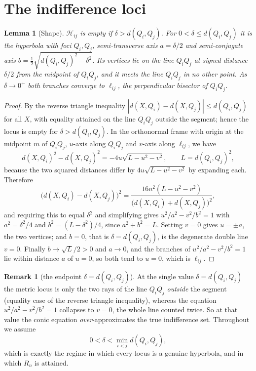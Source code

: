 ﻿\documentclass[11pt,a4paper]{article}
\newtheorem{lemma}[theorem]{Lemma}
\theoremstyle{definition}
\newtheorem{remark}[theorem]{Remark}
\theoremstyle{remark}
\newcommand{\HH}{\mathcal{H}}
\begin{document}
\section{The indifference loci}
\label{sec:geometry}

\begin{lemma}[Shape]\label{lem:hyperbola}
$\HH_{ij}$ is empty if $\delta>d(Q_i,Q_j)$.  For $0<\delta\le d(Q_i,Q_j)$ it is
the hyperbola with foci $Q_i,Q_j$, semi-transverse axis $a=\delta/2$ and
semi-conjugate axis $b=\tfrac12\sqrt{d(Q_i,Q_j)^2-\delta^2}$.  Its vertices lie
on the line $Q_iQ_j$ at signed distance $\delta/2$ from the midpoint of
$Q_iQ_j$, and it meets the line $Q_iQ_j$ in no other point.  As $\delta\to0^+$
both branches converge to $\ell_{ij}$, the perpendicular bisector of $Q_iQ_j$.
\end{lemma}

\begin{proof}
By the reverse triangle inequality $|d(X,Q_i)-d(X,Q_j)|\le d(Q_i,Q_j)$ for all
$X$, with equality attained on the line $Q_iQ_j$ outside the segment; hence the
locus is empty for $\delta>d(Q_i,Q_j)$.  In the orthonormal frame with origin at
the midpoint $m$ of $Q_iQ_j$, $u$-axis along $Q_iQ_j$ and $v$-axis along
$\ell_{ij}$, we have
\[
d(X,Q_i)^2-d(X,Q_j)^2=-4u\sqrt{L-u^2-v^2},\qquad L=d(Q_i,Q_j)^2,
\]
because the two squared distances differ by $4u\sqrt{L-u^2-v^2}$ by expanding
each.  Therefore
\[
\bigl(d(X,Q_i)-d(X,Q_j)\bigr)^2
=\frac{16u^2(L-u^2-v^2)}{\bigl(d(X,Q_i)+d(X,Q_j)\bigr)^2},
\]
and requiring this to equal $\delta^2$ and simplifying gives
$u^2/a^2-v^2/b^2=1$ with $a^2=\delta^2/4$ and $b^2=(L-\delta^2)/4$, since
$a^2+b^2=L$.  Setting $v=0$ gives $u=\pm a$, the two vertices; and $b=0$, that
is $\delta=d(Q_i,Q_j)$, is the degenerate double line $v=0$.  Finally
$b\to\sqrt L/2>0$ and $a\to0$, and the branches of $u^2/a^2-v^2/b^2=1$ lie
within distance $a$ of $u=0$, so both tend to $u=0$, which is $\ell_{ij}$.
\end{proof}

\begin{remark}[the endpoint $\delta=d(Q_i,Q_j)$]\label{rem:endpoint}
At the single value $\delta=d(Q_i,Q_j)$ the metric locus is only the two rays
of the line $Q_iQ_j$ \emph{outside} the segment (equality case of the reverse
triangle inequality), whereas the equation $u^2/a^2-v^2/b^2=1$ collapses to
$v=0$, the whole line counted twice.  So at that value the conic equation
\emph{over}-approximates the true indifference set.  Throughout we assume
\begin{equation}\label{eq:hyperbolic}
0<\delta<\min_{i<j} d(Q_i,Q_j),
\end{equation}
which is exactly the regime in which every locus is a genuine hyperbola, and in
which $R_n$ is attained.
\end{remark}
\end{document}
